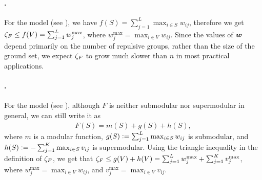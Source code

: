 \paragraph{\flid{}.}
For the \flid{} model (see ), we have $f(S) = \sum_{j=1}^L \max_{i \in S} w_{ij}$, therefore we get $\zeta_F \leq f(V) = \sum_{j=1}^L w_j^{\mathrm{max}}$, where $w_j^{\mathrm{max}} = \max_{i \in V} w_{ij}$.
Since the values of $\bm{w}$ depend primarily on the number of repulsive groups, rather than the size of the ground set, we expect $\zeta_F$ to grow much slower than $n$ in most practical applications.

\paragraph{\fldc{}.}
For the \fldc{} model (see ), although $F$ is neither submodular nor supermodular in general, we can still write it as
\begin{align*}
F(S) = m(S) + g(S) + h(S),
\end{align*}
where $m$ is a modular function, $g(S) \vcentcolon= \sum_{j=1}^L \max_{i \in S} w_{ij}$ is submodular, and $h(S) \vcentcolon= -\sum_{j=1}^K \max_{i \in S} v_{ij}$ is supermodular.
Using the triangle inequality in the definition of $\zeta_F$, we get that $\zeta_F \leq g(V) + h(V) = \sum_{j=1}^L w_j^{\mathrm{max}} + \sum_{j=1}^K v_j^{\mathrm{max}}$, where $w_j^{\mathrm{max}} = \max_{i \in V} w_{ij}$, and $v_j^{\mathrm{max}} = \max_{i \in V} v_{ij}$.

